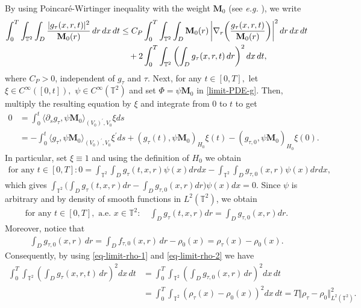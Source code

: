 \documentclass[a4paper,12pt, reqno]{amsart}
\newcommand{\T}{\mathbb{T}}
\begin{document}
          By using  Poincaré-Wirtinger inequality  with the weight $\mathbf{M}_0$ (see \textit{e.g.} \cite[Prop. 3.4.]{Masmoudi2008}), we write 
       \begin{align}\label{Poincare}
\int_0^T \int_{\mathbb T^2} \int_D 
\frac{|g_\tau(x,r,t)|^2}{\mathbf M_0(r)}
\,dr\,dx\,dt
&\le C_P
\int_0^T \int_{\mathbb T^2} \int_D
\mathbf M_0(r)
\left|
\nabla_r \!\left(
\frac{g_\tau(x,r,t)}{\mathbf M_0(r)}
\right)
\right|^2
dr\,dx\,dt \\
&\quad
+2
\int_0^T \int_{\mathbb T^2}
\left(
\int_D g_\tau(x,r,t)\,dr
\right)^2
dx\,dt,\notag
       \end{align}
where $C_P>0$, independent of $g_\tau$ and $\tau$.  Next, for any $t\in [0,T],$ let $\xi\in C^\infty([0,t]),$ $\psi\in C^\infty(\T^2)$ and set $\Phi=\psi\mathbf{M}_0$ in  \eqref{limit-PDE-g}. Then,  multiply the resulting equation by $\xi$ and integrate from $0$ to $t$  to get 
\begin{align*}
 0&=   \int_0^t\langle\partial_s g_\tau,\psi\mathbf{M}_0\rangle_{(V_0)^\prime,V_0}\xi ds\\&=-\int_0^t\langle g_\tau,\psi\mathbf{M}_0\rangle_{(V_0)^\prime,V_0}\xi^\prime ds+ (  g_\tau(t) ,\psi\mathbf{M}_0)_{H_0}\xi(t)- ( g_{\tau,0},\psi\mathbf{M}_0)_{H_0}\xi(0).
\end{align*}
In particular, set $\xi\equiv 1$ and using the definition of $H_0$ we obtain
\begin{align}\label{limit-PDE-g-rho}
\text{for any } t\in [0,T]:   0=\int_{\mathbb T^2} \int_D  g_\tau(t,x,r) \psi(x) drdx-\int_{\mathbb T^2} \int_D g_{\tau,0}(x,r)\psi(x) drdx,
\end{align}
which gives $
   \displaystyle \int_{\mathbb T^2} \bigl(\int_D  g_\tau(t,x,r)dr- \int_D g_{\tau,0}(x,r) dr\bigr)\psi(x) dx=0.
$ Since $\psi$ is arbitrary and by density  of smooth functions in $L^2(\T^2)$, we obtain 
\begin{align}\label{eq-limit-rho-1}
    \text{for any } t\in [0,T], \text{ a.e. } x\in\T^2: \quad \int_D  g_\tau(t,x,r)dr= \int_D g_{\tau,0}(x,r) dr.
\end{align}
Moreover, notice that
\begin{align}\label{eq-limit-rho-2}
    \int_D g_{\tau,0}(x,r)\,dr=\int_D f_{\tau,0}(x,r)\,dr-\rho_0(x)=\rho_\tau(x)-\rho_0(x).
\end{align}
Consequently, by using \eqref{eq-limit-rho-1} and \eqref{eq-limit-rho-2} we have
\begin{align*}
    \int_0^T \int_{\mathbb T^2}
\left(
\int_D g_\tau(x,r,t)\,dr
\right)^2
dx\,dt&= \int_0^T \int_{\mathbb T^2}
\left(\int_D g_{\tau,0}(x,r)\,dr
\right)^2
dx\,dt\\&=\int_0^T \int_{\mathbb T^2}
\left(\rho_\tau(x)-\rho_0(x)
\right)^2
dx\,dt=T\Vert \rho_\tau-\rho_0 \Vert^2_{L^2(\mathbb T^2)}. 
\end{align*}
\end{document}

